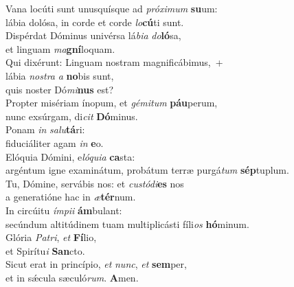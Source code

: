 \evenverse Vana locúti sunt unusquísque ad \textit{pró}\textit{xi}\textit{mum} \textbf{su}um:~\*\\
\evenverse lábia dolósa, in corde et corde \textit{lo}\textbf{cú}ti sunt.\\
\oddverse Dispérdat Dóminus univérsa lá\textit{bi}\textit{a} \textit{do}\textbf{ló}sa,~\*\\
\oddverse et linguam \textit{ma}\textbf{gní}loquam.\\
\evenverse Qui dixérunt: Linguam nostram magnificábimus,~+\\
\evenverse  lábia \textit{no}\textit{stra} \textit{a} \textbf{no}bis sunt,~\*\\
\evenverse quis noster Dó\textit{mi}\textbf{nus} est?\\
\oddverse Propter misériam ínopum, et \textit{gé}\textit{mi}\textit{tum} \textbf{páu}perum,~\*\\
\oddverse nunc exsúrgam, di\textit{cit} \textbf{Dó}minus.\\
\evenverse Ponam \textit{in} \textit{sa}\textit{lu}\textbf{tá}ri:~\*\\
\evenverse fiduciáliter agam \textit{in} \textbf{e}o.\\
\oddverse Elóquia Dómini, e\textit{ló}\textit{qui}\textit{a} \textbf{ca}sta:~\*\\
\oddverse argéntum igne examinátum, probátum terræ purgá\textit{tum} \textbf{sép}tuplum.\\
\evenverse Tu, Dómine, servábis nos: et \textit{cu}\textit{stó}\textit{di}\textbf{es} nos~\*\\
\evenverse a generatióne hac in \textit{æ}\textbf{tér}num.\\
\oddverse In circúitu \textit{ím}\textit{pi}\textit{i} \textbf{ám}bulant:~\*\\
\oddverse secúndum altitúdinem tuam multiplicásti fíli\textit{os} \textbf{hó}minum.\\
\evenverse Glória \textit{Pa}\textit{tri}, \textit{et} \textbf{Fí}lio,~\*\\
\evenverse et Spirítu\textit{i} \textbf{San}cto.\\
\oddverse Sicut erat in princípio, \textit{et} \textit{nunc}, \textit{et} \textbf{sem}per,~\*\\
\oddverse et in sǽcula sæculó\textit{rum}. \textbf{A}men.\\
